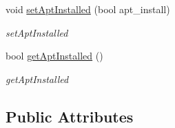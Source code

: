 \begin{DoxyCompactItemize}
void \hyperlink{classDevice_a15d7c755aed944da8514902d06d21ea9}{set\+Apt\+Installed} (bool apt\+\_\+install)
\begin{DoxyCompactList}\small\item\em set\+Apt\+Installed \end{DoxyCompactList}\item 
bool \hyperlink{classDevice_a2ea735319a841af580e6ada8ab3b4076}{get\+Apt\+Installed} ()
\begin{DoxyCompactList}\small\item\em get\+Apt\+Installed \end{DoxyCompactList}\end{DoxyCompactItemize}
\subsection*{Public Attributes}
